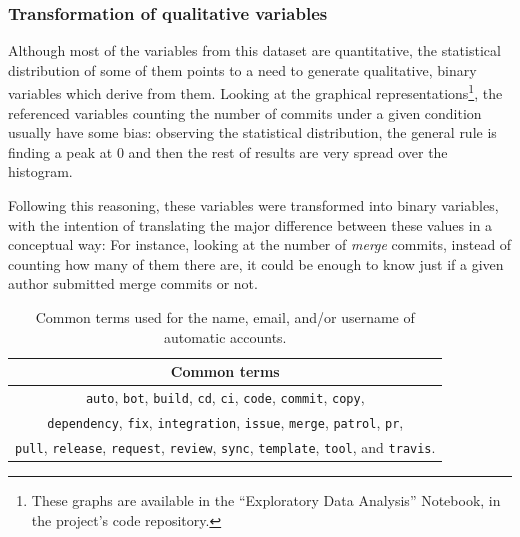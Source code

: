 \documentclass[a4paper, 12pt]{book}
\begin{document}
\subsubsection{Transformation of qualitative variables}
\label{sssec:transformation-qualitative}

Although most of the variables from this dataset are quantitative, the statistical distribution of some of them points to a need to generate 
qualitative, binary variables which derive from them. Looking at the graphical representations\footnote{These graphs are available in the ``Exploratory Data Analysis'' Notebook, in the project's code repository.}, the referenced variables counting the number of commits under a given condition usually have some bias: observing the statistical distribution, the general rule is finding  a peak at $0$ and then the rest of results are very spread over the histogram. 

Following this reasoning, these variables were transformed into binary variables, with the intention of translating the major difference between these values in a conceptual way: For instance, looking at the number of \textit{merge} commits, instead of counting how many of them there are, it could be enough to know just if a given author submitted merge commits or not.

\begin{table}[htb]  %
 \renewcommand{\arraystretch}{1.2}  %
 \begin{center}
  \begin{tabular}{ c }
    \toprule    %
    \textbf{Common terms} \\
    \midrule
    \texttt{auto}, \texttt{bot}, \texttt{build}, \texttt{cd}, \texttt{ci}, \texttt{code}, \texttt{commit}, \texttt{copy},\\
    \texttt{dependency}, \texttt{fix}, \texttt{integration}, \texttt{issue}, \texttt{merge}, \texttt{patrol}, \texttt{pr},\\
    \texttt{pull}, \texttt{release}, \texttt{request}, \texttt{review}, \texttt{sync}, \texttt{template}, \texttt{tool}, and \texttt{travis}. \\
    \bottomrule     %
  \end{tabular}
  \caption{Common terms used for the name, email, and/or username of automatic accounts.}
  \label{table:common-bot-terms}
 \end{center}
\end{table}
\end{document}
